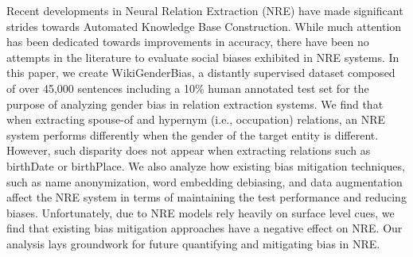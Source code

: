 Recent developments in Neural Relation Extraction (NRE) have made significant strides towards Automated Knowledge Base Construction. While much attention has been dedicated towards improvements in accuracy, there have been no attempts in the literature to evaluate social biases exhibited in NRE systems. In this paper, we create WikiGenderBias, a distantly supervised dataset composed of over 45,000 sentences including a 10\% human annotated test set for the purpose of analyzing gender bias in relation extraction systems. We find that when extracting spouse-of and hypernym (i.e., occupation) relations, an NRE system performs differently when the gender of the target entity is different. However, such disparity does not appear when extracting relations such as birthDate or birthPlace. We also analyze how existing bias mitigation techniques, such as name anonymization, word embedding debiasing, and data augmentation affect the NRE system in terms of maintaining the test performance and reducing biases. Unfortunately, due to NRE models rely heavily on surface level cues, we find that existing bias mitigation approaches have a negative effect on NRE. Our analysis lays groundwork for future quantifying and mitigating bias in NRE.
